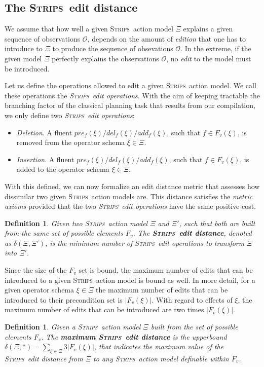 \documentclass{article}
\newcommand{\strips}{\textsc{Strips}}     %
\newtheorem{definition}[theorem]{Definition}
\begin{document}
\subsection{The \strips\ edit distance}
We assume that how well a given \strips\ action model $\Xi$ explains a given sequence of observations $\mathcal{O}$, depends on the amount of {\em edition} that one has to introduce to $\Xi$ to produce the sequence of obsevations $\mathcal{O}$. In the extreme, if the given model $\Xi$ perfectly explains the observations $\mathcal{O}$, no {\em edit} to the model must be introduced. 

Let us define the operations allowed to edit a given \strips\ action model. We call these operations the {\em \strips\ edit operations}. With the aim of keeping tractable the branching factor of the classical planning task that results from our compilation, we only define two {\em \strips\ edit operations}:
\begin{itemize}
\item {\em Deletion}. A fluent $pre_f(\xi)/del_f(\xi)/add_f(\xi)$, such that $f\in F_v(\xi)$, is removed from the operator schema $\xi\in\Xi$.
\item {\em Insertion}. A fluent $pre_f(\xi)/del_f(\xi)/add_f(\xi)$, such that $f\in F_v(\xi)$, is added to the operator schema $\xi\in\Xi$.
\end{itemize}

With this defined, we can now formalize an edit distance metric that assesses how dissimilar two given \strips\ action models are. This distance satisfies the {\em metric axioms} provided that the two {\em \strips\ edit operations} have the same positive cost.
\begin{definition}
Given two \strips\ action model $\Xi$ and $\Xi'$, such that both are built from the same set of possible elements $F_v$. The {\em \bf \strips\ edit distance}, denoted as $\delta(\Xi,\Xi')$, is the minimum number of {\em \strips\ edit operations} to transform $\Xi$ into $\Xi'$.
\end{definition}

Since the size of the $F_v$ set is bound, the maximum number of edits that can be introduced to a given \strips\ action model is bound as well. In more detail, for a given operator schema $\xi\in\Xi$ the maximum number of edits that can be introduced to their precondition set is $|F_v(\xi)|$. With regard to effects of $\xi$, the maximum number of edits that can be introduced are two times $|F_v(\xi)|$.

\begin{definition}
Given a \strips\ action model $\Xi$ built from the set of possible elements $F_v$. The {\em \bf maximum  \strips\ edit distance} is the upperbound $\delta(\Xi,*)=\sum_{\xi\in\Xi} 3|F_v(\xi)|$, that indicates the maximum value of the {\em \strips\ edit distance} from $\Xi$ to any \strips\ action model definable within $F_v$. 
\end{definition}
\end{document}
